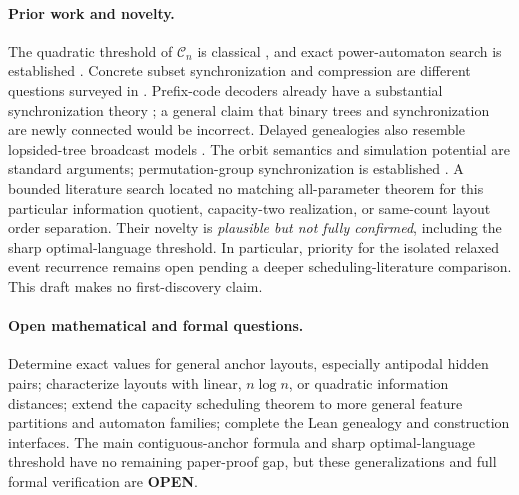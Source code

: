 \documentclass[11pt]{article}
\newcommand{\C}{\mathcal C}
\begin{document}
\paragraph{Prior work and novelty.}
The quadratic threshold of $\C_n$ is classical \cite{volkov}, and exact
power-automaton search is established \cite{search}. Concrete subset
synchronization and compression are different questions surveyed in
\cite{openproblems}. Prefix-code decoders already have a substantial
synchronization theory \cite{huffman}; a general claim that binary trees
and synchronization are newly connected would be incorrect. Delayed
genealogies also resemble lopsided-tree broadcast models \cite{lopsided}.
The orbit semantics and simulation potential are standard arguments;
permutation-group synchronization is established \cite{groups}.
A bounded literature search located no matching all-parameter theorem for
this particular information quotient, capacity-two realization, or
same-count layout order separation. Their novelty is \emph{plausible but
not fully confirmed}, including the sharp optimal-language threshold.
In particular, priority for the isolated relaxed
event recurrence remains open pending a deeper scheduling-literature
comparison. This draft makes no first-discovery claim.

\paragraph{Open mathematical and formal questions.}
Determine exact values for general anchor layouts, especially antipodal
hidden pairs; characterize layouts with linear, $n\log n$, or quadratic
information distances; extend the capacity scheduling theorem to more
general feature partitions and automaton families; complete the Lean
genealogy and construction interfaces. The main contiguous-anchor formula
and sharp optimal-language threshold
have no remaining paper-proof gap, but these generalizations and full
formal verification are \textbf{OPEN}.
\end{document}
